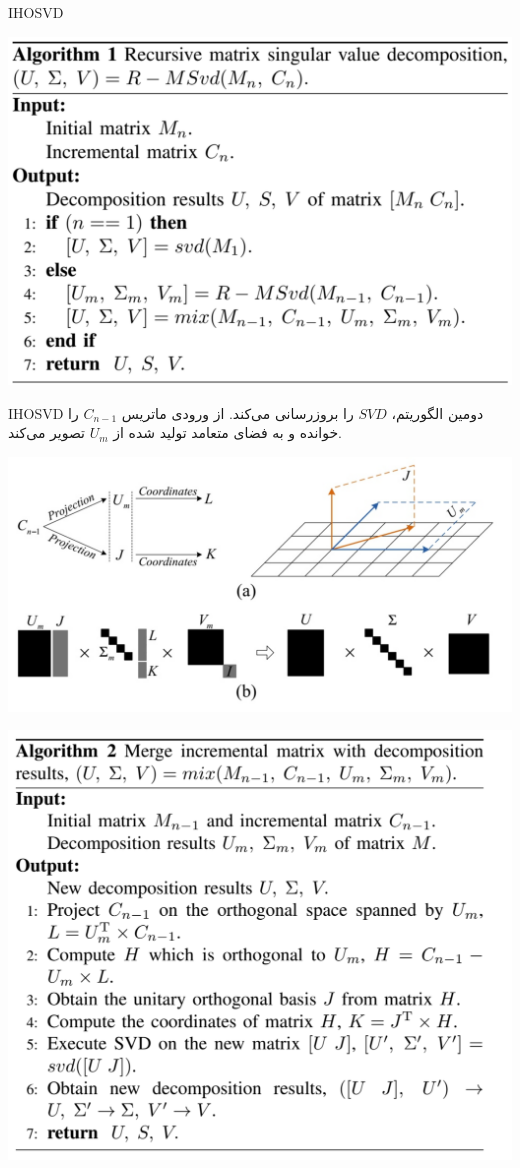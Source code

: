 \begin{frame}{IHOSVD}
\begin{center}
	\includegraphics[width=.8\textwidth]{img/ok/AIHOSVD.pdf}
\end{center}
\end{frame}
\begin{frame}{IHOSVD}
دومین الگوریتم، $SVD$ را بروزرسانی می‌کند. از ورودی ماتریس $C_{n-1}$ را خوانده و به فضای متعامد تولید شده از $U_m$ تصویر می‌کند.
\begin{center}
\includegraphics[width=.8\textwidth]{img/ok/fig8.pdf}
\end{center}
\end{frame}
\begin{frame}
\begin{center}
\includegraphics[width=.8\textwidth]{img/ok/AIHOSVD2.pdf}
\end{center}
\end{frame}

